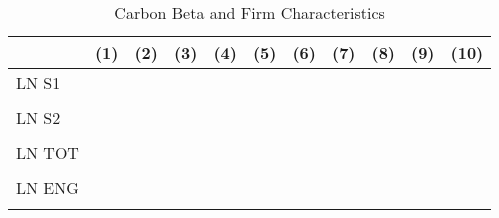 \begin{table}[htbp]\centering
\def\sym#1{\ifmmode^{#1}\else\(^{#1}\)\fi}
\caption{Carbon Beta and Firm Characteristics}
\begin{tabular}{l*{10}{c}}
\hline\hline
                &\multicolumn{1}{c}{(1)}         &\multicolumn{1}{c}{(2)}         &\multicolumn{1}{c}{(3)}         &\multicolumn{1}{c}{(4)}         &\multicolumn{1}{c}{(5)}         &\multicolumn{1}{c}{(6)}         &\multicolumn{1}{c}{(7)}         &\multicolumn{1}{c}{(8)}         &\multicolumn{1}{c}{(9)}         &\multicolumn{1}{c}{(10)}         \\
\hline
LN S1           &                  &                  &                  &                  &                  &                  &                  &                  &                  &                  \\
                &                  &                  &                  &                  &                  &                  &                  &                  &                  &                  \\
LN S2           &                  &                  &                  &                  &                  &                  &                  &                  &                  &                  \\
                &                  &                  &                  &                  &                  &                  &                  &                  &                  &                  \\
LN TOT          &                  &                  &                  &                  &                  &                  &                  &                  &                  &                  \\
                &                  &                  &                  &                  &                  &                  &                  &                  &                  &                  \\
LN ENG          &                  &                  &                  &                  &                  &                  &                  &                  &                  &                  \\
                &                  &                  &                  &                  &                  &                  &                  &                  &                  &                  \\

\end{tabular}
\end{table}
